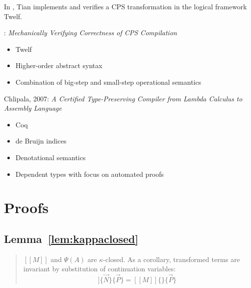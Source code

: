 \documentclass[a4paper,11pt,draft]{article}
\begin{document}
In \cite{Tian-06}, Tian implements and verifies a CPS transformation in the
logical framework Twelf.



: {\em Mechanically Verifying Correctness of CPS Compilation}
\begin{itemize}
\item Twelf
\item Higher-order abstract syntax
\item Combination of big-step and small-step operational semantics
\end{itemize}

Chlipala, 2007: {\em A Certified Type-Preserving Compiler from Lambda Calculus to Assembly Language}
\begin{itemize}
\item Coq
\item de Bruijn indices
\item Denotational semantics
\item Dependent types with focus on automated proofs
\end{itemize}



\appendix


\section{Proofs}\label{sec:proofs}


\subsection{Lemma~\ref{lem:kappaclosed}}

\begin{quote}
  $[\![M]\!]$ and $\Psi(A)$ are $\kappa$-closed. As a corollary, transformed
  terms are invariant by substitution of continuation variables:
  \begin{equation*}
    [\![M]\!]\{\vec{N}\}\{\vec{P}\} = [\![M]\!]\{\}\{\vec{P}\}
  \end{equation*}
\end{quote}
\end{document}
